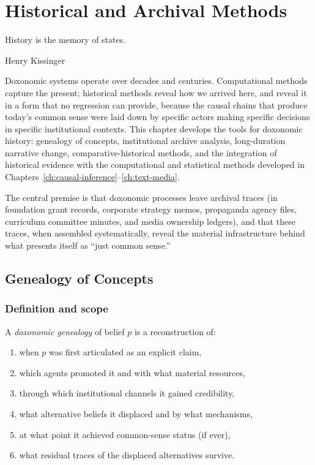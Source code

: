 \chapter{Historical and Archival Methods}
\label{ch:historical-archival}

\epigraph{History is the memory of states.}{Henry Kissinger}

\noindent
Doxonomic systems operate over decades and centuries.
Computational methods capture the present; historical methods reveal how we arrived here, and reveal it in a form that no regression can provide, because the causal chains that produce today's common sense were laid down by specific actors making specific decisions in specific institutional contexts.
This chapter develops the tools for doxonomic history: genealogy of concepts, institutional archive analysis, long-duration narrative change, comparative-historical methods, and the integration of historical evidence with the computational and statistical methods developed in Chapters~\ref{ch:causal-inference}--\ref{ch:text-media}.

The central premise is that doxonomic processes leave archival traces (in foundation grant records, corporate strategy memos, propaganda agency files, curriculum committee minutes, and media ownership ledgers), and that these traces, when assembled systematically, reveal the material infrastructure behind what presents itself as ``just common sense.''

\section{Genealogy of Concepts}
\label{sec:ch18-genealogy}

\subsection{Definition and scope}

\begin{definition}
\label{def:genealogy}
A \emph{doxonomic genealogy} of belief $p$ is a reconstruction of:
\begin{enumerate}[nosep]
  \item when $p$ was first articulated as an explicit claim,
  \item which agents promoted it and with what material resources,
  \item through which institutional channels it gained credibility,
  \item what alternative beliefs it displaced and by what mechanisms,
  \item at what point it achieved common-sense status (if ever),
  \item what residual traces of the displaced alternatives survive.
\end{enumerate}
\end{definition}

